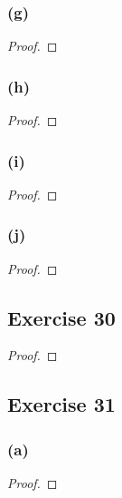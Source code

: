 \documentclass[14pt]{extarticle}
\begin{document}
\subsubsection{(g)}

\begin{proof}

\end{proof}

\subsubsection{(h)}

\begin{proof}

\end{proof}

\subsubsection{(i)}

\begin{proof}

\end{proof}

\subsubsection{(j)}

\begin{proof}

\end{proof}

\subsection{Exercise 30}

\begin{proof}

\end{proof}

\subsection{Exercise 31}

\subsubsection{(a)}

\begin{proof}

\end{proof}
\end{document}
